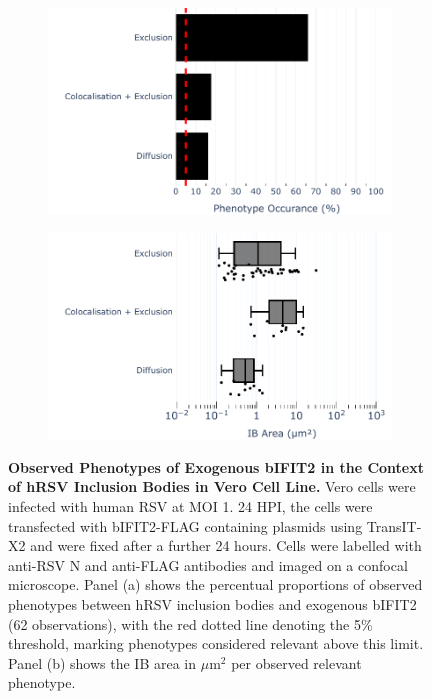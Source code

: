 \begin{figure}
    \begin{subfigure}{0.495\textwidth}
        \caption{}
        \includegraphics[width=1\linewidth]{09. Chapter 4/Figs/02. Overexpression/02. IFIT2/04. bar_bi2f_hrsv.pdf} 
    \end{subfigure}
    \begin{subfigure}{0.495\textwidth}
        \caption{}
        \includegraphics[width=1\linewidth]{09. Chapter 4/Figs/02. Overexpression/02. IFIT2/05. box_bi2f_hrsv.pdf}
    \end{subfigure}
    \caption[Observed Phenotypes of Exogenous bIFIT2 in the Context of hRSV Inclusion Bodies in Vero Cell Line.]{\textbf{Observed Phenotypes of Exogenous bIFIT2 in the Context of hRSV Inclusion Bodies in Vero Cell Line.} Vero cells were infected with human RSV at MOI 1. 24 HPI, the cells were transfected with bIFIT2-FLAG containing plasmids using TransIT-X2 and were fixed after a further 24 hours. Cells were labelled with anti-RSV N and anti-FLAG antibodies and imaged on a confocal microscope. Panel (a) shows the percentual proportions of observed phenotypes between hRSV inclusion bodies and exogenous bIFIT2 (62 observations), with the red dotted line denoting the 5\% threshold, marking phenotypes considered relevant above this limit. Panel (b) shows the IB area in \(\mu \mbox{m}^2\) per observed relevant phenotype.}
    \label{fig:Observed Phenotypes of Exogenous bIFIT2 in the Context of hRSV Inclusion Bodies in Vero Cell Line}
\end{figure}

